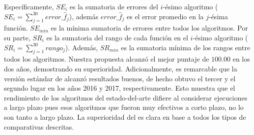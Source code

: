Específicamente, $SE_i$ es la sumatoria de errores del $i$-ésimo algoritmo ($SE_i = \sum_{j=1}^{30} error\_\hat{f}_j$), además $error\_\hat{f}_j$ es el error promedio en la $j$-ésima función.
%
$SE_{min}$ es la mínima sumatoria de errores entre todos los algoritmos.
%
Por su parte, $SR_i$ es la sumatoria del rango de cada función en el $i$-ésimo algoritmo ($SR_i = \sum_{j=1}^{30} rango_j$). %
%
Además, $SR_{min}$ es la sumatoria mínima de los rangos entre todos los algoritmos. %
%
Nuestra propuesta alcanzó el mejor puntaje de $100.00$ en los dos años, demostrando su superioridad. 
%
Adicionalmente, es remarcable que la versión estándar de \DE{} alcanzó resultados buenos, de hecho obtuvo el tercer y el segundo lugar en los años 2016 y 2017, respectivamente.
%
Esto muestra que el rendimiento de los algoritmos del estado-del-arte difiere al considerar ejecuciones a largo plazo pues esos algoritmos que fueron muy efectivos a corto plazo,
no lo son tanto a largo plazo.
%
%
%
La superioridad del \DEEDM{} es clara en base a todos los tipos de comparativas descritas.

